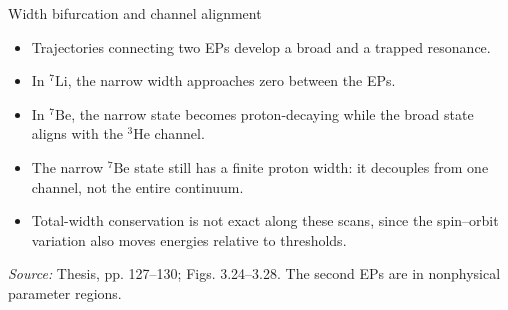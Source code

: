 \documentclass[aspectratio=169,11pt]{beamer}
\newcommand{\nuc}[2]{\ensuremath{{}^{#1}\mathrm{#2}}}
\newcommand{\src}[1]{\par\vfill{\color{muted}\fontsize{7.5}{9}\selectfont\textit{Source:} #1\par}}
\begin{document}
\begin{frame}{Width bifurcation and channel alignment}
\begin{itemize}\setlength\itemsep{3mm}
\item Trajectories connecting two EPs develop a broad and a trapped resonance.
\item In \nuc{7}{Li}, the narrow width approaches zero between the EPs.
\item In \nuc{7}{Be}, the narrow state becomes proton-decaying while the broad state aligns with the \nuc{3}{He} channel.
\item The narrow \nuc{7}{Be} state still has a finite proton width: it decouples from one channel, not the entire continuum.
\item Total-width conservation is not exact along these scans, since the spin--orbit variation also moves energies relative to thresholds.
\end{itemize}
\src{Thesis, pp. 127--130; Figs. 3.24--3.28. The second EPs are in nonphysical parameter regions.}
\end{frame}
\end{document}
